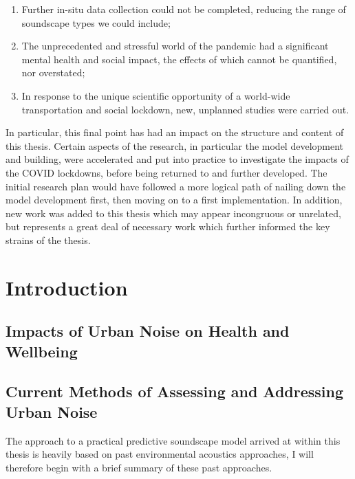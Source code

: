 \documentclass[twoside,fontsize=12pt,titlepage]{scrbook}
\begin{document}
\begin{enumerate}
      \item Further in-situ data collection could not be completed, reducing the range of soundscape types we could include;
      \item The unprecedented and stressful world of the pandemic had a significant mental health and social impact, the effects of which cannot be quantified, nor overstated;
      \item In response to the unique scientific opportunity of a world-wide transportation and social lockdown, new, unplanned studies were carried out.
\end{enumerate}

In particular, this final point has had an impact on the structure and content of this thesis. Certain aspects of the research, in particular the model development and building, were accelerated and put into practice to investigate the impacts of the COVID lockdowns, before being returned to and further developed. The initial research plan would have followed a more logical path of nailing down the model development first, then moving on to a first implementation. In addition, new work was added to this thesis which may appear incongruous or unrelated, but represents a great deal of necessary work which further informed the key strains of the thesis.




\tableofcontents



\chapter{Introduction}

\section{Impacts of Urban Noise on Health and Wellbeing}

\section{Current Methods of Assessing and Addressing Urban Noise}
 The approach to a practical predictive soundscape model arrived at within this thesis is heavily based on past environmental acoustics approaches, I will therefore begin with a brief summary of these past approaches.
\end{document}
